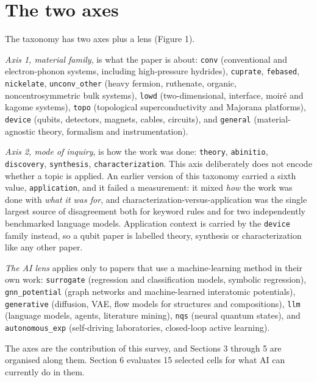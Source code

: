 \documentclass[
  11pt,
]{article}
\begin{document}
\section{The two axes}\label{the-two-axes}

The taxonomy has two axes plus a lens (Figure 1).

\emph{Axis 1, material family}, is what the paper is about:
\texttt{conv} (conventional and electron-phonon systems, including
high-pressure hydrides), \texttt{cuprate}, \texttt{febased},
\texttt{nickelate}, \texttt{unconv\_other} (heavy fermion, ruthenate,
organic, noncentrosymmetric bulk systems), \texttt{lowd}
(two-dimensional, interface, moiré and kagome systems), \texttt{topo}
(topological superconductivity and Majorana platforms), \texttt{device}
(qubits, detectors, magnets, cables, circuits), and \texttt{general}
(material-agnostic theory, formalism and instrumentation).

\emph{Axis 2, mode of inquiry}, is how the work was done:
\texttt{theory}, \texttt{abinitio}, \texttt{discovery},
\texttt{synthesis}, \texttt{characterization}. This axis deliberately
does not encode whether a topic is applied. An earlier version of this
taxonomy carried a sixth value, \texttt{application}, and it failed a
measurement: it mixed \emph{how} the work was done with \emph{what it
was for}, and characterization-versus-application was the single largest
source of disagreement both for keyword rules and for two independently
benchmarked language models. Application context is carried by the
\texttt{device} family instead, so a qubit paper is labelled theory,
synthesis or characterization like any other paper.

\emph{The AI lens} applies only to papers that use a machine-learning
method in their own work: \texttt{surrogate} (regression and
classification models, symbolic regression), \texttt{gnn\_potential}
(graph networks and machine-learned interatomic potentials),
\texttt{generative} (diffusion, VAE, flow models for structures and
compositions), \texttt{llm} (language models, agents, literature
mining), \texttt{nqs} (neural quantum states), and
\texttt{autonomous\_exp} (self-driving laboratories, closed-loop active
learning).

The axes are the contribution of this survey, and Sections 3 through 5
are organised along them. Section 6 evaluates 15 selected cells for what
AI can currently do in them.
\end{document}
